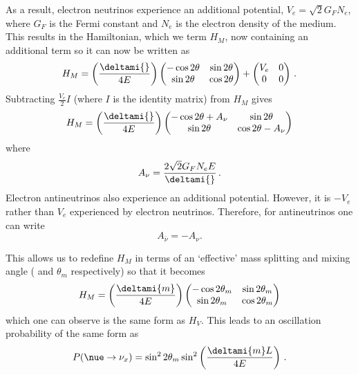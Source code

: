 As a result, electron neutrinos experience an additional potential, $V_{e} = \sqrt{2} G_{F} N_{e}$, where $G_{F}$ is the Fermi constant and $N_{e}$ is the electron density of the medium.
This results in the Hamiltonian, which we term $H_{M}$, now containing an additional term so it can now be written as
\begin{equation}
  H_{M} =  \left( \frac{\deltami{}}{4E} \right)
  \begin{pmatrix}
    -\cos 2\theta & \sin 2\theta \\
    \sin 2\theta & \cos 2\theta
  \end{pmatrix}
  +
  \begin{pmatrix}
    V_{e} & 0 \\
    0 & 0
  \end{pmatrix} \, .
\end{equation}
Subtracting $\frac{V_{e}}{2} I$ (where $I$ is the identity matrix) from $H_{M}$ gives
\begin{equation}
  H_{M} = \left( \frac{\deltami{}}{4E} \right)
  \begin{pmatrix}
    -\cos 2\theta + A_{\nu} & \sin 2\theta \\
    \sin 2\theta & \cos 2\theta - A_{\nu} 
  \end{pmatrix}
\end{equation}
where
\begin{equation}
  A_{\nu} = \frac{ 2\sqrt{2}G_{F}N_{e}E }{\deltami{}} \, .
\end{equation}
Electron antineutrinos also experience an additional potential. 
However, it is $-V_{e}$ rather than $V_{e}$ experienced by electron neutrinos.
Therefore, for antineutrinos one can write
\begin{equation}
	A_{\overline{\nu}} = -A_{\nu} .
\end{equation}

This allows us to redefine $H_{M}$ in terms of an `effective' mass splitting and mixing angle ( and $\theta_{m}$ respectively) so that it becomes
\begin{equation}
  H_{M} = \left( \frac{\deltami{m}}{4E} \right)
  \begin{pmatrix}
    -\cos 2\theta_{m} & \sin 2\theta_{m} \\
    \sin 2\theta_{m} & \cos 2\theta_{m}
  \end{pmatrix}
\end{equation}
which one can observe is the same form as $H_{V}$.
This leads to an oscillation probability of the same form as 
\begin{equation}
  P(\nue \rightarrow \nu_{x}) = \sin^{2} 2\theta_{m} \sin^{2} \left( \frac{\deltami{m} L}{4E} \right) \, .
\end{equation}

